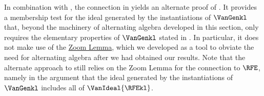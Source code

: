 In combination with , the connection in  yields an alternate proof of . It provides a membership test for the ideal generated by the instantiations of $\VanGenkl$ that, beyond the machinery of alternating algebra developed in this section, only requires the elementary properties of $\VanGenkl$ stated in . In particular, it does not make use of the \hyperref[lem.multi-zsub-deriv]{Zoom Lemma}, which we developed as a tool to obviate the need for alternating algebra after we had obtained our results. Note that the alternate approach to  still relies on the Zoom Lemma for the connection to $\RFE$, namely in the argument that the ideal generated by the instantiations of $\VanGenkl$ includes all of $\VanIdeal{\RFEkl}$.

